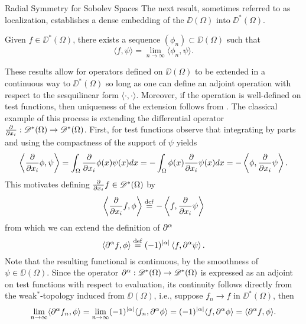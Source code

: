 \begin{chapter}{Radial Symmetry for Sobolev Spaces}
The next result, sometimes referred to as localization, establishes a dense embedding of the $\DD(\Omega)$ into $\DD^*(\Omega)$.
\begin{thm} \label{thm:localization}
  \citep{hormander1983} Given $f\in \DD^*(\Omega)$, there exists a sequence $(\phi_n) \subset \DD(\Omega)$ such that 
  \begin{equation}
    \langle f,\psi\rangle = \lim_{n\to\infty}\langle \phi_n,\psi\rangle.
  \end{equation}
\end{thm}

These results allow for operators defined on $\DD(\Omega)$ to be extended in a continuous way to $\DD^*(\Omega)$ so long as one can define an adjoint operation with respect to the sesquilinear form $\langle \cdot,\cdot \rangle$.
Moreover, if the operation is well-defined on test functions, then uniqueness of the extension follows from .
The classical example of this process is extending the differential operator $\frac{\partial}{\partial x_i}:\mathscr D^*(\Omega) \to \mathscr D^*(\Omega)$. 
First, for test functions observe that integrating by parts and using the compactness of the support of $\psi$ yields
\begin{equation}
  \left\langle \frac{\partial}{\partial x_i} \phi,\psi \right\rangle = \int_{\Omega} \frac{\partial}{\partial x_i} \phi(x) \psi(x) dx = - \int_{\Omega}\phi(x) \frac{\partial}{\partial x_i} \psi(x)dx =- \left\langle \phi, \frac{\partial}{\partial x_i} \psi\right\rangle.
\end{equation}
This motivates defining $\frac{\partial}{\partial x_i} f \in \mathscr D^*(\Omega)$ by
\begin{equation}
  \left\langle \frac{\partial}{\partial x_i} f, \phi \right\rangle 
    \stackrel{\rm def}{=}  - \left\langle f, \frac{\partial}{\partial x_i} \psi\right\rangle
\end{equation}
from which we can extend the definition of $\partial^\alpha$
\begin{equation}\label{eq:distributionalDerivative}
  \left\langle \partial^\alpha f, \phi \right\rangle 
    \stackrel{\rm def}{=}  (-1)^{|\alpha|} \left\langle f, \partial^\alpha \psi\right\rangle.
\end{equation}
Note that the resulting functional is continuous, by the smoothness of $\psi \in \DD(\Omega)$.
Since the operator $\partial^\alpha:\mathscr D^*(\Omega)\to\mathscr D^*(\Omega)$ is expressed as an adjoint on test functions with respect to evaluation, its continuity follows directly from the weak$^*$-topology induced from $\DD(\Omega)$, i.e., suppose $f_n \to f$ in $\DD^*(\Omega)$, then
\begin{align}
  \lim_{n\to \infty}\langle \partial^{\alpha}f_n, \phi\rangle 
  = \lim_{n\to\infty}(-1)^{|\alpha|} \langle f_n,\partial^{\alpha}\phi\rangle
  = (-1)^{|\alpha|} \langle f,\partial^{\alpha}\phi\rangle
  = \langle \partial^{\alpha}f, \phi\rangle.
\end{align}


\end{chapter}
